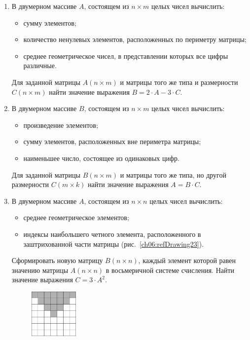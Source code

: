 \begin{enumerate}
\item В двумерном массиве $A$, состоящем из $n\times m$ целых чисел вычислить: 

\begin{itemize}
\item сумму элементов;
\item количество ненулевых элементов, расположенных по периметру матрицы;
\item среднее геометрическое чисел, в представлении которых все цифры различные.
\end{itemize}

Для заданной матрицы $A(n\times m)$ и матрицы того же типа и размерности
$C(n\times m)$ найти значение выражения  $B=2\cdot A-3\cdot C$.
\item В двумерном массиве $B$, состоящем из $n\times m$ целых чисел вычислить:

\begin{itemize}
\item произведение элементов;
\item сумму элементов, расположенных вне периметра матрицы;
\item наименьшее число, состоящее из одинаковых цифр.
\end{itemize}

Для заданной матрицы $B(n\times m)$ и матрицы того же типа, но другой размерности
$C(m\times k)$ найти значение выражения  $A=B\cdot C$.
\item В двумерном массиве $A$, состоящем из $n\times n$ целых чисел вычислить:

\begin{itemize}
\item среднее геометрическое элементов;
\item индексы наибольшего четного элемента, расположенного в заштрихованной части матрицы (рис.~\ref{ch06:refDrawing23}).
\end{itemize}

Сформировать новую матрицу $B(n\times n)$, каждый элемент которой равен значению матрицы
$A(n\times n)$ в восьмеричной системе счисления. Найти
значение выражения  $C=3\cdot A^2$.

\begin{figure}%
\begin{floatrow}[4]
\ffigbox[\FBwidth]
{%
\captionsetup{labelfont=footnotesize}\caption{}%
\label{ch06:refDrawing23}}
{\includegraphics[width=0.225\textwidth,keepaspectratio]{img/ris_6_24}}%


\end{floatrow}
\end{figure}
\end{enumerate}
